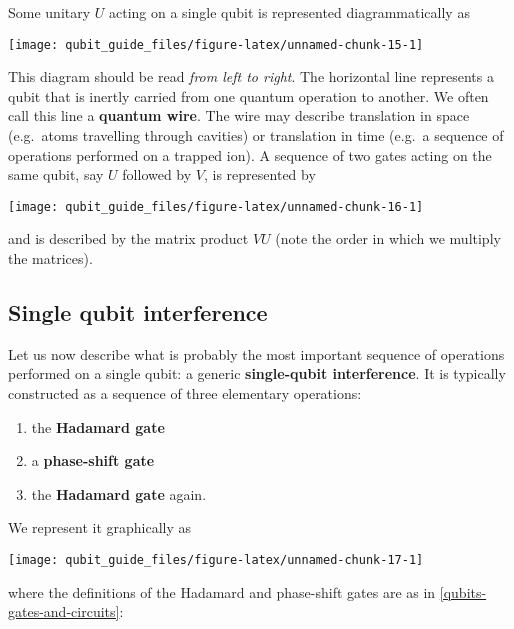 \documentclass[fleqn]{article}
\providecommand{\tightlist}{%
  \setlength{\itemsep}{0pt}\setlength{\parskip}{0pt}}
\begin{document}
Some unitary \(U\) acting on a single qubit is represented diagrammatically as

\begin{center}\texttt{[image: qubit\_guide\_files/figure-latex/unnamed-chunk-15-1]} \end{center}

This diagram should be read \emph{from left to right}.
The horizontal line represents a qubit that is inertly carried from one quantum operation to another.
We often call this line a \textbf{quantum wire}.
The wire may describe translation in space (e.g.~atoms travelling through cavities) or translation in time (e.g.~a sequence of operations performed on a trapped ion).
A sequence of two gates acting on the same qubit, say \(U\) followed by \(V\), is represented by

\begin{center}\texttt{[image: qubit\_guide\_files/figure-latex/unnamed-chunk-16-1]} \end{center}

and is described by the matrix product \(VU\) (note the order in which we multiply the matrices).

\hypertarget{single-qubit-interference}{%
\subsection{Single qubit interference}\label{single-qubit-interference}}

Let us now describe what is probably the most important sequence of operations performed on a single qubit: a generic \textbf{single-qubit interference}.
It is typically constructed as a sequence of three elementary operations:

\begin{enumerate}
\def\labelenumi{\arabic{enumi}.}
\tightlist
\item
  the \textbf{Hadamard gate}
\item
  a \textbf{phase-shift gate}
\item
  the \textbf{Hadamard gate} again.
\end{enumerate}

We represent it graphically as

\begin{center}\texttt{[image: qubit\_guide\_files/figure-latex/unnamed-chunk-17-1]} \end{center}

where the definitions of the Hadamard and phase-shift gates are as in \ref{qubits-gates-and-circuits}:
\end{document}
